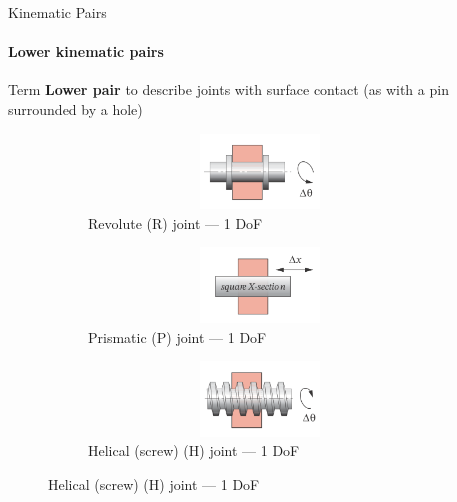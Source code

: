 \documentclass[aspectratio=169]{beamer}
\begin{document}
\begin{frame}[t]{Kinematic Pairs}
\framesubtitle{Lower kinematic pairs}
\vspace{-0.3cm}
Term \textbf{Lower pair} to describe joints with surface contact (as
with a pin surrounded by a hole)
\vspace{-0.3cm}

\begin{figure}[H]
    \begin{subfigure}{0.32\textwidth}
        \centering\includegraphics[height=2cm,width=1\textwidth,keepaspectratio]{R_joint.png}
        \caption{Revolute (R) joint --- 1 DoF}
        \label{fig:R_joint.png}
    \end{subfigure}
    \begin{subfigure}{0.32\textwidth}
        \centering\includegraphics[height=2cm,width=1\textwidth,keepaspectratio]{P_joint.png}
        \caption{Prismatic (P) joint --- 1 DoF}
        \label{fig:P_joint.png}
    \end{subfigure}
    \begin{subfigure}{0.32\textwidth}
        \centering\includegraphics[height=2cm,width=1\textwidth,keepaspectratio]{H_joint.png}
        \caption{Helical (screw) (H) joint --- 1 DoF}
        \label{fig:H_joint.png}
    \end{subfigure}


\end{figure}
\end{frame}
\end{document}
